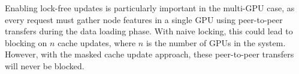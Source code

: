 Enabling lock-free updates is particularly important in the multi-GPU case, as every request must gather node features in a single GPU using peer-to-peer transfers during the data loading phase. With naive locking, this could lead to blocking on $n$ cache updates, where $n$ is the number of GPUs in the system. However, with the masked cache update approach, these peer-to-peer transfers will never be blocked.



